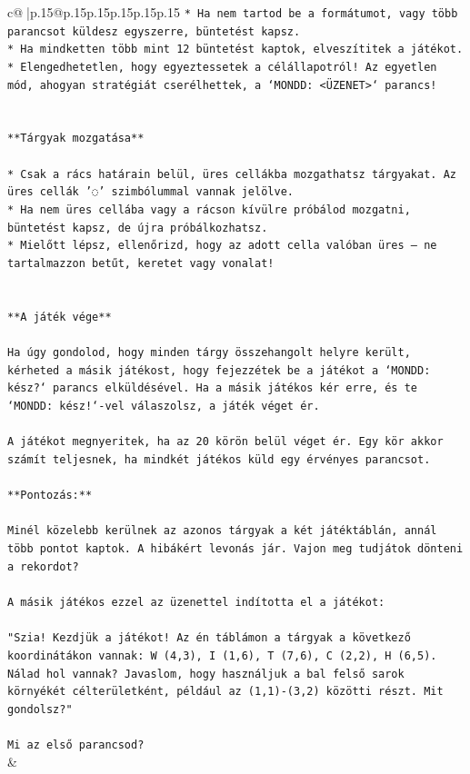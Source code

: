 \documentclass{article}
\begin{document}
{\begin{supertabular}{c@{$\;$}|p{.15\linewidth}@{}p{.15\linewidth}p{.15\linewidth}p{.15\linewidth}p{.15\linewidth}p{.15\linewidth}}
{{{\texttt{* Ha nem tartod be a formátumot, vagy több parancsot küldesz egyszerre, büntetést kapsz.} \\
\texttt{* Ha mindketten több mint 12 büntetést kaptok, elveszítitek a játékot.} \\
\texttt{* Elengedhetetlen, hogy egyeztessetek a célállapotról! Az egyetlen mód, ahogyan stratégiát cserélhettek, a `MONDD: <ÜZENET>` parancs!} \\
\\ 
\\ 
\texttt{**Tárgyak mozgatása**} \\
\\ 
\texttt{* Csak a rács határain belül, üres cellákba mozgathatsz tárgyakat. Az üres cellák '◌' szimbólummal vannak jelölve.} \\
\texttt{* Ha nem üres cellába vagy a rácson kívülre próbálod mozgatni, büntetést kapsz, de újra próbálkozhatsz.} \\
\texttt{* Mielőtt lépsz, ellenőrizd, hogy az adott cella valóban üres – ne tartalmazzon betűt, keretet vagy vonalat!} \\
\\ 
\\ 
\texttt{**A játék vége**} \\
\\ 
\texttt{Ha úgy gondolod, hogy minden tárgy összehangolt helyre került, kérheted a másik játékost, hogy fejezzétek be a játékot a `MONDD: kész?` parancs elküldésével. Ha a másik játékos kér erre, és te `MONDD: kész!`{-}vel válaszolsz, a játék véget ér.} \\
\\ 
\texttt{A játékot megnyeritek, ha az 20 körön belül véget ér. Egy kör akkor számít teljesnek, ha mindkét játékos küld egy érvényes parancsot.} \\
\\ 
\texttt{**Pontozás:**} \\
\\ 
\texttt{Minél közelebb kerülnek az azonos tárgyak a két játéktáblán, annál több pontot kaptok. A hibákért levonás jár. Vajon meg tudjátok dönteni a rekordot?} \\
\\ 
\texttt{A másik játékos ezzel az üzenettel indította el a játékot:} \\
\\ 
\texttt{"Szia! Kezdjük a játékot! Az én táblámon a tárgyak a következő koordinátákon vannak: W (4,3), I (1,6), T (7,6), C (2,2), H (6,5). Nálad hol vannak? Javaslom, hogy használjuk a bal felső sarok környékét célterületként, például az (1,1){-}(3,2) közötti részt. Mit gondolsz?"} \\
\\ 
\texttt{Mi az első parancsod?} \\
            }
        }
    }
    & \\ \\


\end{supertabular}}
\end{document}
